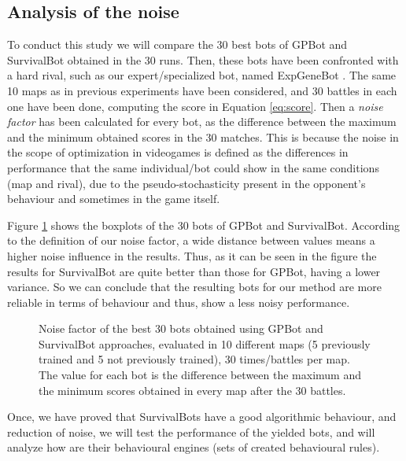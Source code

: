 \documentclass[conference]{IEEEtran}
\begin{document}
\subsection{Analysis of the noise}
\label{subsec:analysisnoise}

To conduct this study we will compare the 30 best bots of GPBot and SurvivalBot obtained in the 30 runs. Then, these bots have been confronted with a hard rival, such as our expert/specialized bot, named ExpGeneBot \cite{Genebot_CIG2012}.
The same 10 maps as in previous experiments have been considered, and 30 battles in each one have been done, computing the score in Equation \ref{eq:score}.
Then a \textit{noise factor} has been calculated for every bot, as the difference between the maximum and the minimum obtained scores in the 30 matches. This is because the noise in the scope of optimization in videogames is defined as the differences in performance that the same individual/bot could show in the same conditions (map and rival), due to the pseudo-stochasticity present in the opponent's behaviour and sometimes in the game itself.

Figure \ref{figura:noise} shows the boxplots of the 30 bots of GPBot and SurvivalBot. According to the definition of our noise factor, a wide distance between values means a higher noise influence in the results. Thus, as it can be seen in the figure the results for SurvivalBot are quite better than those for GPBot, having a lower variance. So we can conclude that the resulting bots for our method are more reliable in terms of behaviour and thus, show a less noisy performance.

\begin{figure}[htb]
\tiny
\begin{center}
\end{center}
\caption{Noise factor of the best 30 bots obtained using GPBot and SurvivalBot approaches, evaluated in 10 different maps (5 previously trained and 5 not previously trained), 30 times/battles per map. The value for each bot is the difference between the maximum and the minimum scores obtained in every map after the 30 battles.}
\label{figura:noise}
\end{figure}

Once, we have proved that SurvivalBots have a good algorithmic behaviour, and reduction of noise, we will test the performance of the yielded bots, and will analyze how are their behavioural engines (sets of created behavioural rules).
\end{document}
